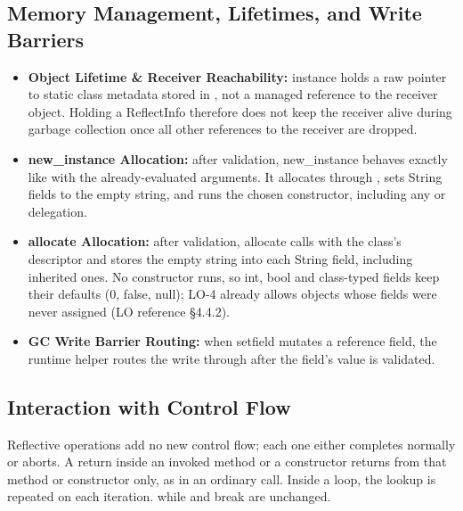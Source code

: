 \subsection*{Memory Management,  Lifetimes, and Write Barriers}
\begin{itemize}
  \item \textbf{ Object Lifetime \& Receiver Reachability:}
     instance holds a raw pointer to static class metadata
    stored in , not a managed reference to the receiver object.
    Holding a ReflectInfo therefore does not keep the receiver alive during
    garbage collection once all other references to the receiver are dropped.
  \item \textbf{new\_instance Allocation:} after validation, new\_instance
    behaves exactly like  with the
    already-evaluated arguments. It allocates through , sets
    String fields to the empty string, and runs the chosen constructor,
    including any  or  delegation.
  \item \textbf{allocate Allocation:} after validation, allocate calls
     with the class's descriptor and stores the empty string
    into each String field, including inherited ones. No constructor runs, so
    int, bool and class-typed fields keep their defaults (0, false, null);
    LO-4 already allows objects whose fields were never assigned (LO reference
    \S4.4.2).
  \item \textbf{GC Write Barrier Routing:} when setfield mutates a reference
    field, the runtime helper routes the write through
     after the field's value is validated.
\end{itemize}

\subsection*{Interaction with Control Flow}
Reflective operations add no new control flow; each one either completes
normally or aborts. A return inside an invoked method or a constructor returns
from that method or constructor only, as in an ordinary call. Inside a loop,
the lookup is repeated on each iteration. while and break are unchanged.

